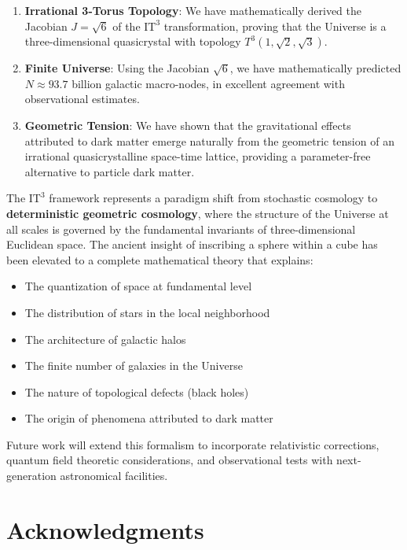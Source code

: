 \documentclass[12pt,a4paper,oneside]{article}
\newcommand{\ITthree}{\text{IT}^3}
\begin{document}
\begin{enumerate}
    \item \textbf{Irrational 3-Torus Topology}: We have mathematically derived the Jacobian $J = \sqrt{6}$ of the $\ITthree$ transformation, proving that the Universe is a three-dimensional quasicrystal with topology $T^3(1, \sqrt{2}, \sqrt{3})$.
    
    \item \textbf{Finite Universe}: Using the Jacobian $\sqrt{6}$, we have mathematically predicted $N \approx 93.7$ billion galactic macro-nodes, in excellent agreement with observational estimates.
    
    \item \textbf{Geometric Tension}: We have shown that the gravitational effects attributed to dark matter emerge naturally from the geometric tension of an irrational quasicrystalline space-time lattice, providing a parameter-free alternative to particle dark matter.
\end{enumerate}

The $\ITthree$ framework represents a paradigm shift from stochastic cosmology to \textbf{deterministic geometric cosmology}, where the structure of the Universe at all scales is governed by the fundamental invariants of three-dimensional Euclidean space. The ancient insight of inscribing a sphere within a cube has been elevated to a complete mathematical theory that explains:
\begin{itemize}
    \item The quantization of space at fundamental level
    \item The distribution of stars in the local neighborhood
    \item The architecture of galactic halos
    \item The finite number of galaxies in the Universe
    \item The nature of topological defects (black holes)
    \item The origin of phenomena attributed to dark matter
\end{itemize}

Future work will extend this formalism to incorporate relativistic corrections, quantum field theoretic considerations, and observational tests with next-generation astronomical facilities.

\section*{Acknowledgments}
\end{document}
